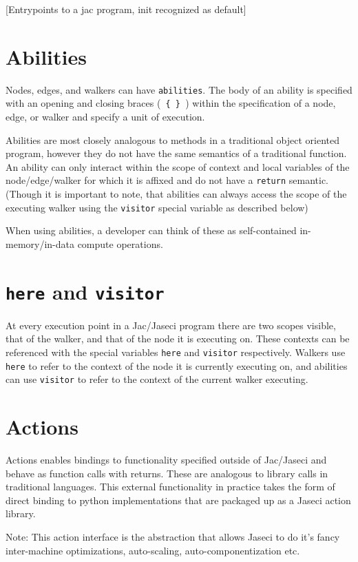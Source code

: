 [Entrypoints to a jac program, init recognized as default]

\section{Abilities}

Nodes, edges, and walkers can have \texttt{abilities}.
The body of an ability is specified with an opening and closing braces (\texttt{ \{ \} }) within the specification of a node, edge, or walker and specify a unit of execution.

Abilities are most closely analogous to methods in a traditional object oriented program, however they do not have the same semantics of a traditional function.
An ability can only interact within the scope of context and local variables of the node/edge/walker for which it is affixed and do not have a \texttt{return} semantic. (Though it is important to note, that abilities can always access the scope of the executing walker using the \lstinline{visitor} special variable as described below)

When using abilities, a developer can think of these as self-contained in-memory/in-data compute operations.

\section{\texttt{here} and \texttt{visitor}}

At every execution point in a Jac/Jaseci program there are two scopes visible, that of the walker, and that of the node it is executing on.
These contexts can be referenced with the special variables \lstinline{here} and \lstinline{visitor} respectively.
Walkers use \lstinline{here} to refer to the context of the node it is currently executing on, and abilities can use \lstinline{visitor} to refer to the context of the current walker executing.

\section{Actions}

Actions enables bindings to functionality specified outside of Jac/Jaseci and behave as function calls with returns.
These are analogous to library calls in traditional languages.
This external functionality in practice takes the form of direct binding to python implementations that are packaged up as a Jaseci action library.

\begin{nerd}
    Note: This action interface is the abstraction that allows Jaseci to do it's fancy inter-machine optimizations, auto-scaling, auto-componentization etc.
\end{nerd}